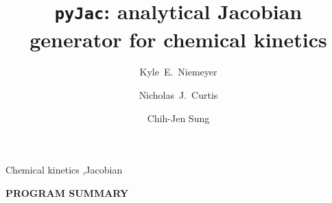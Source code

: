 \documentclass[preprint,12pt]{elsarticle}
\begin{document}
\begin{frontmatter}

\title{\texttt{pyJac}: analytical Jacobian generator for chemical kinetics}

\author[osu]{Kyle~E.\ Niemeyer}

\author[uconn]{Nicholas~J.\ Curtis}
\author[uconn]{Chih-Jen Sung}

\address[osu]{School of Mechanical, Industrial, and Manufacturing Engineering\\
	Oregon State University, Corvallis, OR 97331, USA}
\address[uconn]{Department of Mechanical Engineering\\
	University of Connecticut, Storrs, CT, 06269, USA}



\begin{abstract}

\end{abstract}

\begin{keyword}
Chemical kinetics \sep Jacobian
\end{keyword}

\end{frontmatter}





{\bf PROGRAM SUMMARY}
\end{document}
